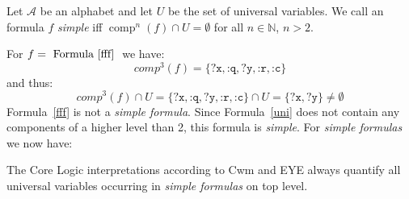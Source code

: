 


\begin{definition}
Let $\mathcal{A}$ be an \nthree alphabet and let $U$ be the set of universal variables.
We call an \nthree formula $f$ \emph{simple} iff  $\operatorname{comp}^n(f)\cap U=\emptyset$ for all $n \in \mathbb{N}$, $n>2$.
\end{definition}

For $f=\text{ Formula~\ref{fff} }$ we have:  \[\textit{comp}^3(f)=\{\texttt{?x}, \texttt{:q}, \texttt{?y}, \texttt{:r}, \texttt{:c}\}\]
and thus:
\[\textit{comp}^3(f)\cap U=\{\texttt{?x}, \texttt{:q}, \texttt{?y}, \texttt{:r}, \texttt{:c}\}\cap U = \{\texttt{?x}, \texttt{?y}\}\neq \emptyset\]
Formula~\ref{fff} is not a \emph{simple formula}. Since Formula~\ref{uni} does not contain any components of a higher level than 2, this formula is \emph{simple}.
For \emph{simple formulas} we now have:

\begin{lemma}
The \nthree Core Logic interpretations according to Cwm and EYE always quantify all universal variables occurring in \emph{simple formulas} on top level. 
\end{lemma}


